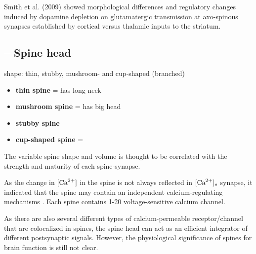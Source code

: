 Smith et al. (2009) showed morphological differences and regulatory changes
induced by dopamine depletion on glutamatergic transmission at axo-spinous
synapses established by cortical versus thalamic inputs to the striatum.


\subsection{-- Spine head}
\label{sec:spine-head}

shape: thin, stubby, mushroom- and cup-shaped (branched)
   \begin{itemize}
     \item {\bf thin spine} = has long neck
     
     \item {\bf mushroom spine} = has big head
     
     \item {\bf stubby spine}
     
     \item {\bf cup-shaped spine} = 
   \end{itemize}
The variable spine shape and volume is thought to be correlated with the
strength and maturity of each spine-synapse.

As the change in $[{\text{Ca}^{2+}}]$ in the spine is not always reflected in $[{\text{Ca}^{2+}}]_s$
synapse, it indicated that the spine may contain an independent
calcium-regulating mechanisms \citep{segal2002}. Each spine contains 1-20
voltage-sensitive calcium channel.

As there are also several different types of calcium-permeable receptor/channel
that are colocalized in spines, the spine head can act as an efficient
integrator of different postsynaptic signals. 
However, the physiological significance of
spines for brain function is still not clear.

